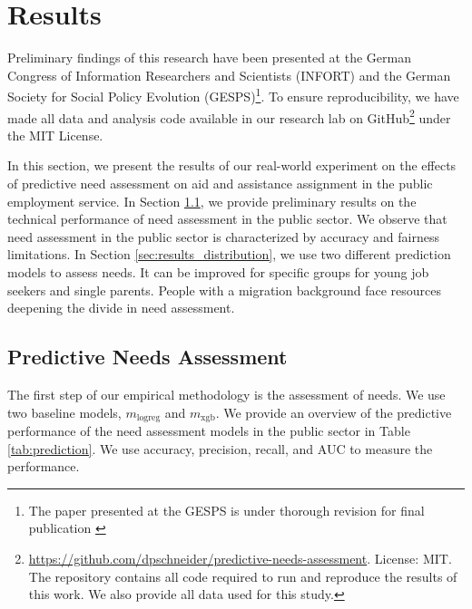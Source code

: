 \section{Results}

\label{sec:results}
Preliminary findings of this research have been presented at the German Congress of Information Researchers and Scientists (INFORT) and the German Society for Social Policy Evolution (GESPS)\footnote{The paper presented at the GESPS is under thorough revision for final publication \cite{fischer2024}}. 
To ensure reproducibility, we have made all data and analysis code available in our research lab on GitHub\footnote{\url{https://github.com/dpschneider/predictive-needs-assessment}. License: MIT. The repository contains all code required to run and reproduce the results of this work. We also provide all data used for this study.} under the MIT License. 

In this section, we present the results of our real-world experiment on the effects of predictive need assessment on aid and assistance assignment in the public employment service. In Section \ref{sec:results_accuracy}, we provide preliminary results on the technical performance of need assessment in the public sector. We observe that need assessment in the public sector is characterized by accuracy and fairness limitations. In Section \ref{sec:results_distribution}, we use two different prediction models to assess needs. It can be improved for specific groups for young job seekers and single parents. People with a migration background face resources deepening the divide in need assessment. 

\subsection{Predictive Needs Assessment}
\label{sec:results_accuracy}
The first step of our empirical methodology is the assessment of needs. We use two baseline models, $m_{\mathrm{logreg}}$ and $m_{\mathrm{xgb}}$. We provide an overview of the predictive performance of the need assessment models in the public sector in Table \ref{tab:prediction}. We use accuracy, precision, recall, and AUC to measure the performance.

